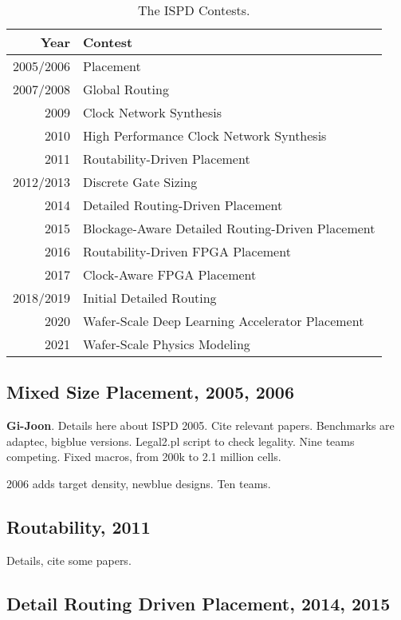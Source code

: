 \documentclass[sigconf]{acmart}
\begin{document}
\begin{table}
  \begin{tabular}{|r|l|}\hline
    Year & Contest \\ \hline
    2005/2006 & Placement \\ \hline
    2007/2008 & Global Routing \\ \hline
    2009 & Clock Network Synthesis \\ \hline    
    2010 & High Performance Clock Network Synthesis \\ \hline    
    2011 & Routability-Driven Placement \\ \hline
    2012/2013 & Discrete Gate Sizing \\ \hline
    2014 & Detailed Routing-Driven Placement \\ \hline    
    2015 & Blockage-Aware Detailed Routing-Driven Placement \\ \hline
    2016 & Routability-Driven FPGA Placement \\ \hline
    2017 & Clock-Aware FPGA Placement \\ \hline    
    2018/2019 & Initial Detailed Routing \\ \hline    
    2020 & Wafer-Scale Deep Learning Accelerator Placement \\ \hline
    2021 & Wafer-Scale Physics Modeling \\ \hline
  \end{tabular}
  \caption{The ISPD Contests.}
  \label{tab:ispdcontest}
\end{table}

\subsection{Mixed Size Placement, 2005, 2006}

{\bf Gi-Joon}.  
\cite{ISPD05_contest}
Details here about ISPD 2005.  Cite relevant papers.
Benchmarks are adaptec, bigblue versions.  Legal2.pl script to
check legality.  Nine teams competing.
Fixed macros, from 200k to 2.1 million cells.

2006 adds target density, newblue designs.  Ten teams.  

\subsection{Routability, 2011}


Details, cite some papers.

\subsection{Detail Routing Driven Placement, 2014, 2015}
\end{document}
